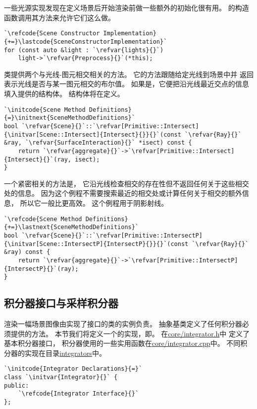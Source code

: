一些光源实现发现在定义场景后开始渲染前做一些额外的初始化很有用。
的构造函数调用其方法来允许它们这么做。
\begin{lstlisting}
`\refcode{Scene Constructor Implementation}{+=}\lastcode{SceneConstructorImplementation}`
for (const auto &light : `\refvar{lights}{}`)
    light->`\refvar{Preprocess}{}`(*this);
\end{lstlisting}

类提供两个与光线-图元相交相关的方法。
它的方法跟随给定光线到场景中并
返回表示光线是否与某一图元相交的布尔值。
如果是，它便把沿光线最近交点的信息填入提供的结构体。
结构体将在定义。
\begin{lstlisting}
`\initcode{Scene Method Definitions}{=}\initnext{SceneMethodDefinitions}`
bool `\refvar{Scene}{}`::`\refvar[Primitive::Intersect]{\initvar[Scene::Intersect]{Intersect}{}}{}`(const `\refvar{Ray}{}` &ray, `\refvar{SurfaceInteraction}{}` *isect) const {
    return `\refvar{aggregate}{}`->`\refvar[Primitive::Intersect]{Intersect}{}`(ray, isect);
}
\end{lstlisting}
一个紧密相关的方法是，
它沿光线检查相交的存在性但不返回任何关于这些相交处的信息。
因为这个例程不需要搜索最近的相交处或计算任何关于相交的额外信息，
所以它一般比更高效。
这个例程用于阴影射线。
\begin{lstlisting}
`\refcode{Scene Method Definitions}{+=}\lastnext{SceneMethodDefinitions}`
bool `\refvar{Scene}{}`::`\refvar[Primitive::IntersectP]{\initvar[Scene::IntersectP]{IntersectP}{}}{}`(const `\refvar{Ray}{}` &ray) const {
    return `\refvar{aggregate}{}`->`\refvar[Primitive::IntersectP]{IntersectP}{}`(ray);
}
\end{lstlisting}

\subsection{积分器接口与采样积分器}\label{sub:积分器接口与采样积分器}
渲染一幅场景图像由实现了接口的类的实例负责。
抽象基类定义了任何积分器必须提供的方法。
本节我们将定义一个的实现，即。
在\href{https://github.com/mmp/pbrt-v3/tree/master/src/core/integrator.h}{\ttfamily core/integrator.h}中
定义了基本积分器接口，
积分器使用的一些实用函数在\href{https://github.com/mmp/pbrt-v3/blob/master/src/core/integrator.cpp}{\ttfamily core/integrator.cpp}中。
不同积分器的实现在目录\href{https://github.com/mmp/pbrt-v3/tree/master/src/integrators}{\ttfamily integrators}中。
\begin{lstlisting}
`\initcode{Integrator Declarations}{=}`
class `\initvar{Integrator}{}` {
public:
    `\refcode{Integrator Interface}{}`
};
\end{lstlisting}

